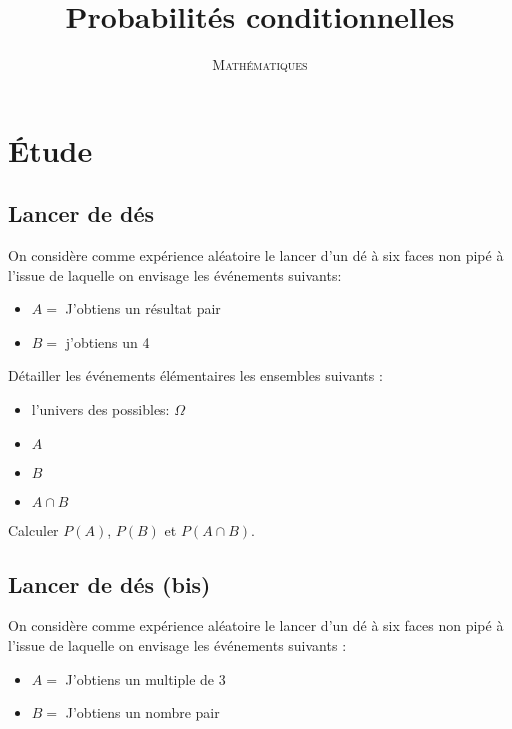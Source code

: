 \documentclass[a4paper,12pt]{scrartcl}
\date{}
\title{Probabilités conditionnelles}
\author{\textsc{Mathématiques}}
\begin{document}
\maketitle

\tableofcontents

\section{Étude}

\subsection{Lancer de dés}

On considère comme expérience aléatoire le lancer d’un dé à six faces non pipé à l’issue de laquelle on envisage les événements suivants:

\begin{itemize}
\item $A =$ \og J’obtiens un résultat pair  \fg{}
\item $B =$ \og j’obtiens un 4 \fg{}
\end{itemize}

Détailler les événements élémentaires les ensembles suivants : 	

\begin{itemize}
\item l'univers des possibles: $\Omega$
\item $A$
\item $B$
\item $A \cap B$
\end{itemize}


Calculer $P(A)$, $P(B)$ et $P(A \cap B)$.


\subsection{Lancer de dés (bis)}

On considère comme expérience aléatoire le lancer d’un dé à six faces non pipé à l’issue de laquelle on envisage les événements suivants :

\begin{itemize}
\item $A = $ \og J'obtiens un multiple de 3 \fg{} 
\item $B = $ \og J'obtiens un nombre pair \fg{} 
\end{itemize}
\end{document}
